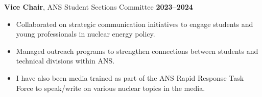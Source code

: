 \documentclass[margin,line]{resume}
\begin{document}
\begin{resume}
    \textbf{Vice Chair}, ANS Student Sections Committee  \hfill \textbf{2023--2024}\vspace{.5mm}\\%
    \begin{itemize}
        \item Collaborated on strategic communication initiatives to engage students and young professionals in nuclear energy policy.
        \item Managed outreach programs to strengthen connections between students and technical divisions within ANS.
        \item I have also been media trained as part of the ANS Rapid Response Task Force to speak/write on various nuclear topics in the media.
    \end{itemize}

\end{resume}
\end{document}
